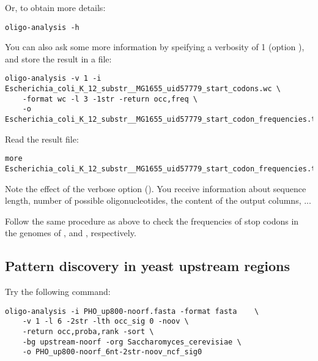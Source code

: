 Or, to obtain more details:
{\color{Blue} \begin{footnotesize} 
\begin{verbatim}
oligo-analysis -h
\end{verbatim} \end{footnotesize}
}

You can also ask some more information by speifying a verbosity of 1
(option ), and store the result in a file:

{\color{Blue} \begin{footnotesize} 
\begin{verbatim}
oligo-analysis -v 1 -i Escherichia_coli_K_12_substr__MG1655_uid57779_start_codons.wc \
    -format wc -l 3 -1str -return occ,freq \
    -o Escherichia_coli_K_12_substr__MG1655_uid57779_start_codon_frequencies.tab
\end{verbatim} \end{footnotesize}
}

Read the result file:

{\color{Blue} \begin{footnotesize} 
\begin{verbatim}
more Escherichia_coli_K_12_substr__MG1655_uid57779_start_codon_frequencies.tab
\end{verbatim} \end{footnotesize}
}


Note the effect of the verbose option (). You receive
information about sequence length, number of possible
oligonucleotides, the content of the output columns, ...


\begin{exercise}
  Follow the same procedure as above to check the frequencies of stop
  codons in the genomes of , and
  \org{Saccharomyces cerevisia}, respectively.
\end{exercise}

\subsection{Pattern discovery in yeast upstream regions}

Try the following command:

{\color{Blue} \begin{footnotesize} 
\begin{verbatim} 
oligo-analysis -i PHO_up800-noorf.fasta -format fasta    \
    -v 1 -l 6 -2str -lth occ_sig 0 -noov \
    -return occ,proba,rank -sort \
    -bg upstream-noorf -org Saccharomyces_cerevisiae \
    -o PHO_up800-noorf_6nt-2str-noov_ncf_sig0 
\end{verbatim} \end{footnotesize}
}


